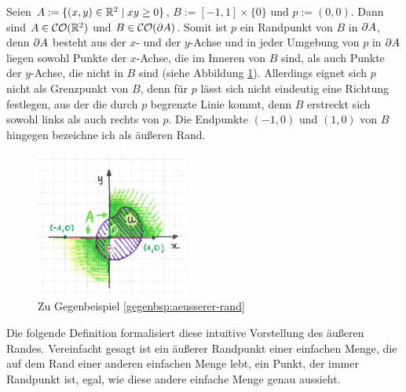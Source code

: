     \begin{gegenbsp}\label{gegenbsp:aeusserer-rand}
        Seien $A := \{(x,y) \in \mathbb{R}^2 \mid xy \geq 0\}$, $B := [-1,1] \times \{0\}$ und $p := (0,0)$. 
        Dann sind $A \in \mathcal{CO}(\mathbb{R}^2)$ und $B \in \mathcal{CO}(\partial A)$.
        Somit ist $p$ ein Randpunkt von $B$ in $\partial A$, denn $\partial A$ besteht aus der $x$- und der $y$-Achse und in jeder Umgebung von $p$ in $\partial A$ liegen sowohl Punkte der $x$-Achse, die im Inneren von $B$ sind, als auch Punkte der $y$-Achse, die nicht in $B$ sind (siehe Abbildung \ref{fig:kein-aeusserer-rand}).
        Allerdings eignet sich $p$ nicht als Grenzpunkt von $B$, denn für $p$ lässt sich nicht eindeutig eine Richtung festlegen, \glqq aus der die durch $p$ begrenzte Linie kommt\grqq, denn $B$ erstreckt sich sowohl links als auch rechts von $p$.
        Die Endpunkte $(-1,0)$ und $(1,0)$ von $B$ hingegen bezeichne ich als äußeren Rand.
    \end{gegenbsp}
    
    \begin{figure}[ht]
        \centering
        \includegraphics[width=5cm]{abb/kein-aeusserer-rand.png}
        \caption{Zu Gegenbeispiel \ref{gegenbsp:aeusserer-rand}}
        \label{fig:kein-aeusserer-rand}
    \end{figure}

    Die
    folgende Definition formalisiert diese intuitive Vorstellung des äußeren Randes.
    Vereinfacht gesagt ist ein äußerer Randpunkt einer einfachen Menge, die auf dem Rand einer anderen einfachen Menge \glqq lebt\grqq, ein Punkt, der immer Randpunkt ist, egal, wie diese andere einfache Menge genau aussieht.

